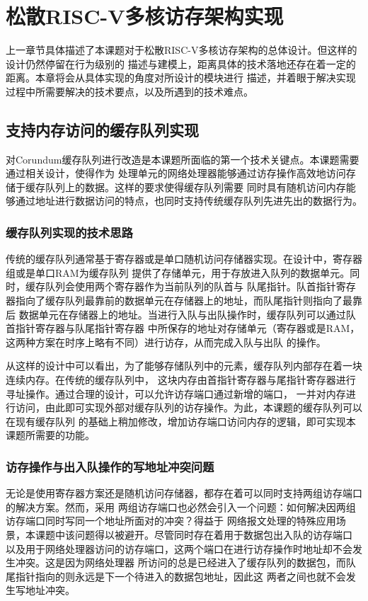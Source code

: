 \section{松散RISC-V多核访存架构实现}

上一章节具体描述了本课题对于松散RISC-V多核访存架构的总体设计。但这样的设计仍然停留在行为级别的
描述与建模上，距离具体的技术落地还存在着一定的距离。本章将会从具体实现的角度对所设计的模块进行
描述，并着眼于解决实现过程中所需要解决的技术要点，以及所遇到的技术难点。

\subsection{支持内存访问的缓存队列实现}

对Corundum缓存队列进行改造是本课题所面临的第一个技术关键点。本课题需要通过相关设计，使得作为
处理单元的网络处理器能够通过访存操作高效地访问存储于缓存队列上的数据。这样的要求使得缓存队列需要
同时具有随机访问内存能够通过地址进行数据访问的特点，也同时支持传统缓存队列先进先出的数据行为。

\subsubsection{缓存队列实现的技术思路}

传统的缓存队列通常基于寄存器或是单口随机访问存储器实现。在设计中，寄存器组或是单口RAM为缓存队列
提供了存储单元，用于存放进入队列的数据单元。同时，缓存队列会使用两个寄存器作为当前队列的队首与
队尾指针。队首指针寄存器指向了缓存队列最靠前的数据单元在存储器上的地址，而队尾指针则指向了最靠后
数据单元在存储器上的地址。当进行入队与出队操作时，缓存队列可以通过队首指针寄存器与队尾指针寄存器
中所保存的地址对存储单元（寄存器或是RAM，这两种方案在时序上略有不同）进行访存，从而完成入队与出队
的操作。

从这样的设计中可以看出，为了能够存储队列中的元素，缓存队列内部存在着一块连续内存。在传统的缓存队列中，
这块内存由首指针寄存器与尾指针寄存器进行寻址操作。通过合理的设计，可以允许访存端口通过新增的端口，
一并对内存进行访问，由此即可实现外部对缓存队列的访存操作。为此，本课题的缓存队列可以在现有缓存队列
的基础上稍加修改，增加访存端口访问内存的逻辑，即可实现本课题所需要的功能。

\subsubsection{访存操作与出入队操作的写地址冲突问题}

无论是使用寄存器方案还是随机访问存储器，都存在着可以同时支持两组访存端口的解决方案。然而，采用
两组访存端口也必然会引入一个问题：如何解决因两组访存端口同时写同一个地址所面对的冲突？得益于
网络报文处理的特殊应用场景，本课题中该问题得以被避开。尽管同时存在着用于数据包出入队的访存端口
以及用于网络处理器访问的访存端口，这两个端口在进行访存操作时地址却不会发生冲突。这是因为网络处理器
所访问的总是已经进入了缓存队列的数据包，而队尾指针指向的则永远是下一个待进入的数据包地址，因此这
两者之间也就不会发生写地址冲突。

